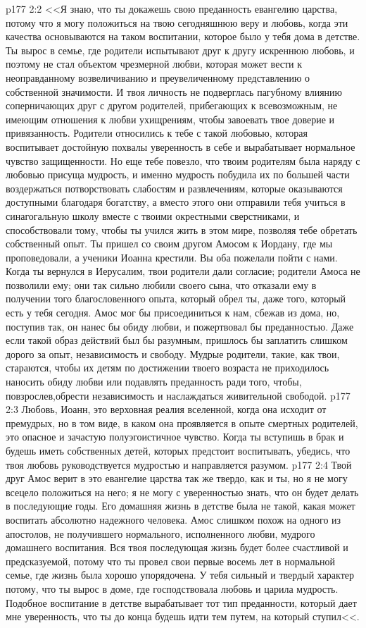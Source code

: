\vs p177 2:2 <<Я знаю, что ты докажешь свою преданность евангелию царства, потому что я могу положиться на твою сегодняшнюю веру и любовь, когда эти качества основываются на таком воспитании, которое было у тебя дома в детстве. Ты вырос в семье, где родители испытывают друг к другу искреннюю любовь, и поэтому не стал объектом чрезмерной любви, которая может вести к неоправданному возвеличиванию и преувеличенному представлению о собственной значимости. И твоя личность не подверглась пагубному влиянию соперничающих друг с другом родителей, прибегающих к всевозможным, не имеющим отношения к любви ухищрениям, чтобы завоевать твое доверие и привязанность. Родители относились к тебе с такой любовью, которая воспитывает достойную похвалы уверенность в себе и вырабатывает нормальное чувство защищенности. Но еще тебе повезло, что твоим родителям была наряду с любовью присуща мудрость, и именно мудрость побудила их по большей части воздержаться потворствовать слабостям и развлечениям, которые оказываются доступными благодаря богатству, а вместо этого они отправили тебя учиться в синагогальную школу вместе с твоими окрестными сверстниками, и способствовали тому, чтобы ты учился жить в этом мире, позволяя тебе обретать собственный опыт. Ты пришел со своим другом Амосом к Иордану, где мы проповедовали, а ученики Иоанна крестили. Вы оба пожелали пойти с нами. Когда ты вернулся в Иерусалим, твои родители дали согласие; родители Амоса не позволили ему; они так сильно любили своего сына, что отказали ему в получении того благословенного опыта, который обрел ты, даже того, который есть у тебя сегодня. Амос мог бы присоединиться к нам, сбежав из дома, но, поступив так, он нанес бы обиду любви, и пожертвовал бы преданностью. Даже если такой образ действий был бы разумным, пришлось бы заплатить слишком дорого за опыт, независимость и свободу. Мудрые родители, такие, как твои, стараются, чтобы их детям по достижении твоего возраста не приходилось наносить обиду любви или подавлять преданность ради того, чтобы, повзрослев,обрести независимость и наслаждаться живительной свободой.
\vs p177 2:3 Любовь, Иоанн, это верховная реалия вселенной, когда она исходит от премудрых, но в том виде, в каком она проявляется в опыте смертных родителей, это опасное и зачастую полуэгоистичное чувство. Когда ты вступишь в брак и будешь иметь собственных детей, которых предстоит воспитывать, убедись, что твоя любовь руководствуется мудростью и направляется разумом.
\vs p177 2:4 Твой друг Амос верит в это евангелие царства так же твердо, как и ты, но я не могу всецело положиться на него; я не могу с уверенностью знать, что он будет делать в последующие годы. Его домашняя жизнь в детстве была не такой, какая может воспитать абсолютно надежного человека. Амос слишком похож на одного из апостолов, не получившего нормального, исполненного любви, мудрого домашнего воспитания. Вся твоя последующая жизнь будет более счастливой и предсказуемой, потому что ты провел свои первые восемь лет в нормальной семье, где жизнь была хорошо упорядочена. У тебя сильный и твердый характер потому, что ты вырос в доме, где господствовала любовь и царила мудрость. Подобное воспитание в детстве вырабатывает тот тип преданности, который дает мне уверенность, что ты до конца будешь идти тем путем, на который ступил<<.
